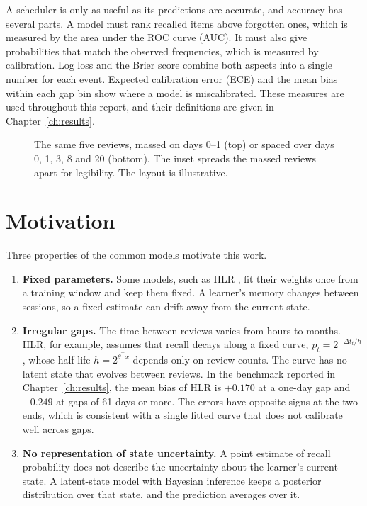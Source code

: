 A scheduler is only as useful as its predictions are accurate, and accuracy has several parts. A
model must rank recalled items above forgotten ones, which is measured by the area under the ROC
curve (AUC). It must also give probabilities that match the observed frequencies, which is measured
by calibration. Log loss and the Brier score combine both aspects into a single number for each
event. Expected calibration error (ECE) and the mean bias within each gap bin show where a model
is miscalibrated. These measures are used throughout this report, and their definitions are given
in Chapter~\ref{ch:results}.

\begin{figure}[htbp]
  \centering
  
  \caption{The same five reviews, massed on days 0--1 (top) or spaced over days 0, 1, 3, 8 and 20
    (bottom). The inset spreads the massed reviews apart for legibility. The layout is illustrative.}
  \label{fig:tk_spaced_vs_massed}
\end{figure}

\section{Motivation}
\label{sec:intro-motivation}

Three properties of the common models motivate this work.

\begin{enumerate}
  \item \textbf{Fixed parameters.} Some models, such as HLR \cite{settles2016trainable}, fit their
    weights once from a training window and keep them fixed. A learner's memory changes
    between sessions, so a fixed estimate can drift away from the current state.
  \item \textbf{Irregular gaps.} The time between reviews varies from hours to months. HLR, for
    example, assumes that recall decays along a fixed curve, $p_t = 2^{-\Delta t_t/h}$, whose half-life
    $h = 2^{\theta^\top x}$ depends only on review counts. The curve has no latent state that evolves
    between reviews. In the benchmark reported in Chapter~\ref{ch:results}, the mean bias of HLR is
    $+0.170$ at a one-day gap and $-0.249$ at gaps of 61 days or more. The errors have opposite signs
    at the two ends, which is consistent with a single fitted curve that does not calibrate well
    across gaps.
  \item \textbf{No representation of state uncertainty.} A point estimate of recall probability does
    not describe the uncertainty about the learner's current state. A latent-state model with Bayesian
    inference keeps a posterior distribution over that state, and the prediction averages over it.
\end{enumerate}

